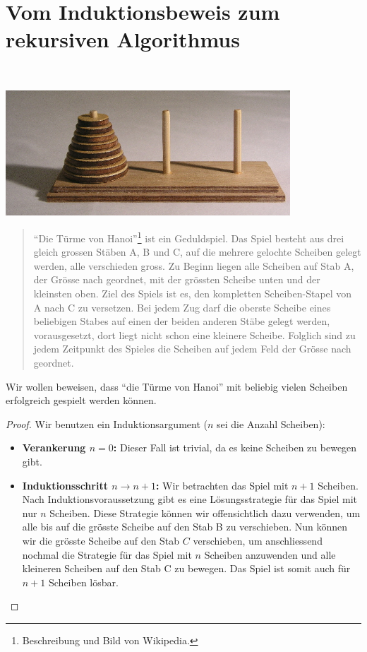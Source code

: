 \section{Vom Induktionsbeweis zum rekursiven Algorithmus}

\begin{example}~
\begin{center}
\includegraphics[width=0.8\textwidth]{figures/hanoi}
\end{center}
\begin{quote}
``Die Türme von Hanoi''\footnote{Beschreibung und Bild von Wikipedia.} ist ein Geduldspiel. Das Spiel besteht aus drei gleich grossen Stäben A, B und C, auf die mehrere gelochte Scheiben gelegt werden, alle verschieden gross. Zu Beginn liegen alle Scheiben auf Stab A, der Grösse nach geordnet, mit der grössten Scheibe unten und der kleinsten oben. Ziel des Spiels ist es, den kompletten Scheiben-Stapel von A nach C zu versetzen.
Bei jedem Zug darf die oberste Scheibe eines beliebigen Stabes auf einen der beiden anderen Stäbe gelegt werden, vorausgesetzt, dort liegt nicht schon eine kleinere Scheibe. Folglich sind zu jedem Zeitpunkt des Spieles die Scheiben auf jedem Feld der Grösse nach geordnet.
\end{quote}
Wir wollen beweisen, dass ``die Türme von Hanoi'' mit beliebig vielen Scheiben erfolgreich gespielt werden können.
\begin{proof} Wir benutzen ein Induktionsargument ($n$ sei die Anzahl Scheiben):
\begin{itemize}
\item \textbf{Verankerung $n=0$:} Dieser Fall ist trivial, da es keine Scheiben zu bewegen gibt.
\item \textbf{Induktionsschritt $n\to n+1$:} Wir betrachten das Spiel mit $n+1$ Scheiben. Nach Induktionsvoraussetzung gibt es eine Lösungsstrategie für das Spiel mit nur $n$ Scheiben. Diese Strategie können wir offensichtlich dazu verwenden, um alle bis auf die grösste Scheibe auf den Stab B zu verschieben. Nun können wir die grösste Scheibe auf den Stab $C$ verschieben, um anschliessend nochmal die Strategie für das Spiel mit $n$ Scheiben anzuwenden und alle kleineren Scheiben auf den Stab C zu bewegen. Das Spiel ist somit auch für $n+1$ Scheiben lösbar. \qedhere

\end{itemize}
\end{proof}
\end{example}

